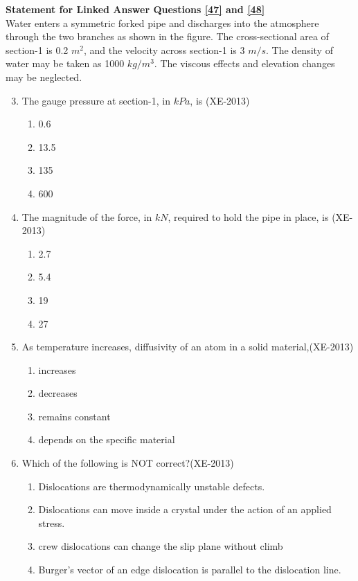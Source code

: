 \documentclass[journal]{IEEEtran}
\numberwithin{equation}{enumi}
\numberwithin{figure}{enumi}
\begin{document}
\textbf{Statement for Linked Answer Questions \ref{47} and \ref{48} }\\
Water enters a symmetric forked pipe and discharges into the atmosphere through the two branches as shown in the figure. The cross-sectional area of section-1 is 0.2 $m^2$, and the velocity across section-1 is 3 $m/s$. The density of water may be taken as 1000 $kg/m^3$. The viscous effects and elevation changes may be neglected. 



\begin{enumerate}
    \setcounter{enumi}{2} %
    \item The gauge pressure at section-1, in $kPa$, is \label{47} \hfill(XE-2013)
    \begin{multicols}{4}
        \begin{enumerate}
            \item 0.6
            \item 13.5
            \item 135
            \item 600
        \end{enumerate}
    \end{multicols}

    \item The magnitude of the force, in $kN$, required to hold the pipe in place, is \label{48} \hfill(XE-2013)
    \begin{multicols}{4}
        \begin{enumerate}
            \item 2.7
            \item 5.4
            \item 19
            \item 27
        \end{enumerate}
    \end{multicols}





    

\item As temperature increases, diffusivity of an atom in a solid material,\hfill(XE-2013)
\begin{enumerate}
    \item increases
    \item decreases
    \item remains constant
    \item depends on the specific material
\end{enumerate}
\item Which of the following is NOT correct?\hfill(XE-2013)
\begin{enumerate}
    \item Dislocations are thermodynamically unstable defects.
    \item Dislocations can move inside a crystal under the action of an applied stress.
    \item crew dislocations can change the slip plane without climb
    \item Burger's vector of an edge dislocation is parallel to the dislocation line.
    

\end{enumerate}
\end{enumerate}
\end{document}
